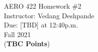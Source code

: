 \documentclass[]{article}
\begin{document}

\begin{center}
    {\Large AERO 422 Homework \#2}\\ %
    \vspace{0.2 cm}
    Instructor: Vedang Deshpande\\ %
    \vspace{0.2 cm}
    Due: [TBD] at 12:40p.m.\\ %
    \vspace{0.2 cm}
    Fall 2021\\ %
    \vspace{0.2 cm}
    (\textbf{TBC Points})\\
\end{center}

\vspace{0.2 cm}
\end{document}
